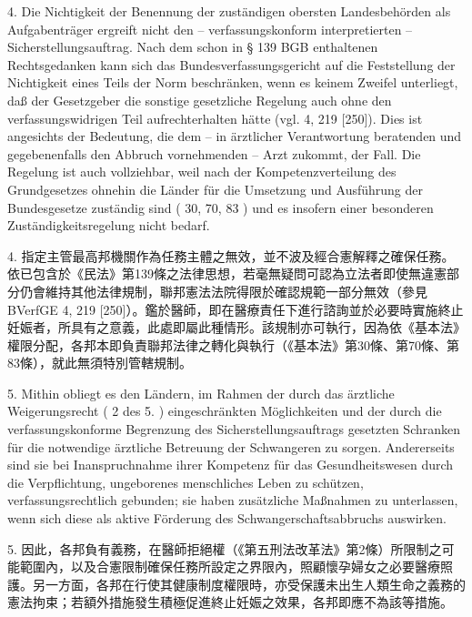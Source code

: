 \documentclass[12pt]{article}
\begin{document}
\begin{sourcepara}[title={原文E.256}]
4. Die Nichtigkeit der Benennung der zuständigen obersten Landesbehörden als Aufgabenträger ergreift nicht den -- verfassungskonform interpretierten -- Sicherstellungsauftrag. Nach dem schon in § 139 BGB enthaltenen Rechtsgedanken kann sich das Bundesverfassungsgericht auf die Feststellung der Nichtigkeit eines Teils der Norm beschränken, wenn es keinem Zweifel unterliegt, daß der Gesetzgeber die sonstige gesetzliche Regelung auch ohne den verfassungswidrigen Teil aufrechterhalten hätte (vgl. \abbrBVerfGE{} 4, 219 [250]). Dies ist angesichts der Bedeutung, die dem -- in ärztlicher Verantwortung beratenden und gegebenenfalls den Abbruch vornehmenden -- Arzt zukommt, der Fall. Die Regelung ist auch vollziehbar, weil nach der Kompetenzverteilung des Grundgesetzes ohnehin die Länder für die Umsetzung und Ausführung der Bundesgesetze zuständig sind (\abbrArt{} 30, 70, 83 \abbrGG{}) und es insofern einer besonderen Zuständigkeitsregelung nicht bedarf.
\end{sourcepara}
\begin{transpara}
4. 指定主管最高邦機關作為任務主體之無效，並不波及經合憲解釋之確保任務。依已包含於《民法》第139條之法律思想，若毫無疑問可認為立法者即使無違憲部分仍會維持其他法律規制，聯邦憲法法院得限於確認規範一部分無效（參見 BVerfGE 4, 219 [250]）。鑑於醫師，即在醫療責任下進行諮詢並於必要時實施終止妊娠者，所具有之意義，此處即屬此種情形。該規制亦可執行，因為依《基本法》權限分配，各邦本即負責聯邦法律之轉化與執行（《基本法》第30條\ggfnArtThirtyZH{}、第70條、第83條），就此無須特別管轄規制。
\end{transpara}

\begin{sourcepara}[title={原文E.257}]
5. Mithin obliegt es den Ländern, im Rahmen der durch das ärztliche Weigerungsrecht (\abbrArt{} 2 des 5. \abbrStrRG{}) eingeschränkten Möglichkeiten und der durch die verfassungskonforme Begrenzung des Sicherstellungsauftrags gesetzten Schranken für die notwendige ärztliche Betreuung der Schwangeren zu sorgen. Andererseits sind sie bei Inanspruchnahme ihrer Kompetenz für das Gesundheitswesen durch die Verpflichtung, ungeborenes menschliches Leben zu schützen, verfassungsrechtlich gebunden; sie haben zusätzliche Maßnahmen zu unterlassen, wenn sich diese als aktive Förderung des Schwangerschaftsabbruchs auswirken.
\end{sourcepara}
\begin{transpara}
5. 因此，各邦負有義務，在醫師拒絕權（《第五刑法改革法》第2條）所限制之可能範圍內，以及合憲限制確保任務所設定之界限內，照顧懷孕婦女之必要醫療照護。另一方面，各邦在行使其健康制度權限時，亦受保護未出生人類生命之義務的憲法拘束；若額外措施發生積極促進終止妊娠之效果，各邦即應不為該等措施。
\end{transpara}
\end{document}
